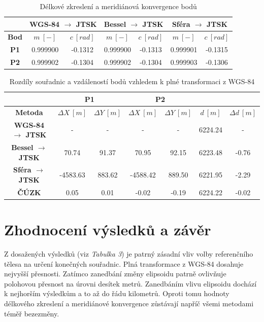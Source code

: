 \documentclass[12pt, a4paper]{article}
\begin{document}
\vspace{3mm}

\begin{table}[htpb]
\centering
\footnotesize
\setlength{\tabcolsep}{6pt}
\begin{tabular}{|c|c|c|c|c|c|c|}
  \hline
   & \multicolumn{2}{c|}{\textbf{WGS-84 $\rightarrow$ JTSK}} & \multicolumn{2}{c|}{\textbf{Bessel $\rightarrow$ JTSK}} & \multicolumn{2}{c|}{\textbf{Sféra $\rightarrow$ JTSK}} \\ \hline
   \textbf{Bod} & $m \ [-]$ & $c \ [rad]$ & $m \ [-]$ & $c \ [rad]$ & $m \ [-]$ & $c \ [rad]$ \\ \hline
   \textbf{P1} & 0.999900 & -0.1312 & 0.999900 & -0.1313 & 0.999901 & -0.1315 \\ \hline
   \textbf{P2} & 0.999902 & -0.1304 & 0.999902 & -0.1304 & 0.999903 & -0.1306 \\ \hline
\end{tabular}
\caption{Délkové zkreslení a meridiánová konvergence bodů}
\end{table}
\vspace{3mm}

\begin{table}[htpb]
\centering
\footnotesize
\setlength{\tabcolsep}{5pt}
\begin{tabular}{|c|c|c|c|c|c|c|} \hline
      & \multicolumn{2}{c|}{\textbf{P1}} & \multicolumn{2}{c|}{\textbf{P2}} & \multicolumn{2}{c|}{}\\ \hline
      \textbf{Metoda} & $\Delta X \ [m]$ & $\Delta Y \ [m]$ & $\Delta X \ [m]$ & $\Delta Y \ [m]$ & $d \ [m]$ & $\Delta d \ [m]$ \\ \hline
     \textbf{WGS-84 $\rightarrow$ JTSK} & - & - & - & - & 6224.24 & - \\ \hline
     \textbf{Bessel $\rightarrow$ JTSK} & 70.74 & 91.37 & 70.95 & 92.15 & 6223.48 & -0.76 \\ \hline
     \textbf{Sféra $\rightarrow$ JTSK} & -4583.63 & 883.62 & -4588.42 & 889.50 & 6221.95 & -2.29 \\ \hline
     \textbf{ČÚZK} & 0.05 & 0.01 & -0.02 & -0.19 & 6224.22 & -0.02 \\ \hline
\end{tabular}
\caption{Rozdíly souřadnic a vzdáleností bodů vzhledem k plné transformaci z WGS-84}
\end{table}

\section{Zhodnocení výsledků a závěr}
\vspace{5mm}
Z dosažených výsledků (viz \textit{Tabulka 3}) je patrný zásadní vliv volby referenčního tělesa na určení konečných souřadnic. Plná transformace z WGS-84 dosahuje nejvyšší přesnosti. Zatímco zanedbání změny elipsoidu patrně ovlivňuje polohovou přesnost na úrovni desítek metrů. Zanedbáním vlivu elipsoidu dochází k nejhorším výsledkům a to až do řádu kilometrů. Oproti tomu hodnoty délkového zkreslení a meridiánové konvergence zůstávají napříč všemi metodami téměř bezezměny. 
\end{document}
